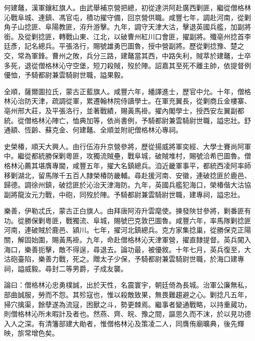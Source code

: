 \begin{pinyinscope}
何建鼇，漢軍鑲紅旗人。由武舉補京營把總，初從達洪阿赴廣西剿匪，繼從僧格林沁戰阜城、連鎮、馮官屯，積功擢守備，回京營供職。咸豐七年，調赴河南，從剿角子山捻匪、阜陽教匪，洊升游擊。九年，調守天津大沽，擊退英國兵艦，加副將銜。及從剿捻匪，轉戰山東、江北，以破曹州紅川口會匪，擢副將。殲亳州捻首李廷彥，記名總兵。平張洛行，賜號雄勇巴圖魯，授中營副將。歷從剿捻豫、楚之交，常為軍鋒。曹州之敗，兵分三路，建鼇當其西，中路失利，賊萃於建鼇，士卒多死，退從僧格林沁守空堡，短刀殺賊，歿於陣。詔嘉其至死不離主帥，依提督例優恤，予騎都尉兼雲騎尉世職，謚果毅。

全順，薩爾圖拉氏，蒙古正藍旗人。咸豐六年，繙譯進士，歷官中允。十年，僧格林沁治防天津，疏調從軍，累遷翰林院侍讀學士。在軍充翼長，從剿商丘金樓寨、亳州邢大莊，及平張洛行，並著戰績，賜黃馬褂。擢內閣學士，授西安左翼副都統。從僧格林沁陣亡，恤典加等，依尚書例，予騎都尉兼雲騎尉世職，謚忠壯。舒通額、恆齡、蘇克金、何建鼇、全順並附祀僧格林沁專祠。

史榮椿，順天大興人。由行伍洊升京營參將，歷從揚威將軍奕經、大學士賽尚阿軍中。繼從都統勝保剿粵匪，攻獨流賊壘，戰阜城，破賊堆村，賜號洽希巴圖魯。僧格林沁薦其堪膺專閫，咸豐五年，擢大名鎮總兵。洎近畿軍事平，都統西凌阿率師移剿湖北，留馬隊千五百人隸榮椿防畿輔。尋赴援河南、安徽，連破捻匪於鹿邑、歸德。調徐州鎮，破捻匪於沁治天津海防。九年，英國兵艦犯海口，榮椿偕大沽協副將龍汝元力戰，中砲，同歿於陣。予騎都尉兼雲騎尉世職，建專祠，謚忠壯。

樂善，伊勒忒氏，蒙古正白旗人。由拜唐阿洊升雲麾使。揀發陜甘參將，剿番匪有功。從勝保剿粵匪，戰獨流、阜城，賜號巴克敦巴圖魯。咸豐六年，率馬隊剿捻匪河南，連破賊於鹿邑、潁川。七年，擢河北鎮總兵。克方家集捻巢，從勝保克正陽關，解固始圍，賜黃馬褂。九年，命赴僧格林沁天津軍營，擢直隸提督。英兵闖入海口，樂善扼擊，敵不得逞，尋退去。論功最，被優敘。十年七月，英兵復至，大沽砲臺陷，樂善力戰，死之。贈太子少保，予騎都尉兼雲騎尉世職，於海口建專祠，謚威毅。尋封二等男爵，子成友襲。

論曰：僧格林沁忠勇樸誠，出於天性，名震寰宇，朝廷倚為長城。治軍公廉無私，部曲誠服，勞而不怨。其殄寇也，惟以殺敵致果，無畏難趨避之心。剿捻凡五年，掃穴擒渠，餘孽遂為流寇，困獸之斗，勢更棘焉。繼事者變通戰略，以持重蕆功，則僧格林沁所未暇計及者也。然燕、齊、皖、豫之間，謳思久而不沫，於以見功德入人之深。有清籓部建大勛者，惟僧格林沁及策凌二人，同膺侑廟曠典，後先輝映，旂常增色矣。


\end{pinyinscope}